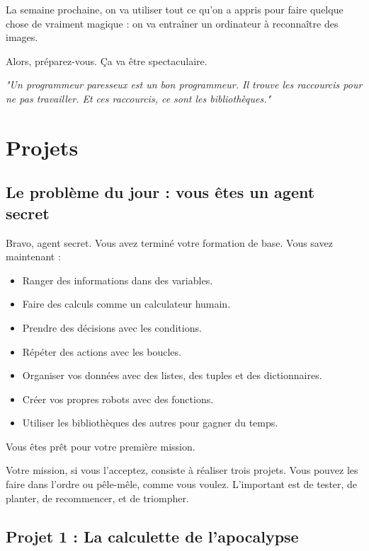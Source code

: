 \documentclass[12pt,a4paper]{article}
\begin{document}
La semaine prochaine, on va utiliser tout ce qu'on a appris pour faire quelque chose de vraiment magique : on va entraîner un ordinateur à reconnaître des images.

Alors, préparez-vous. Ça va être spectaculaire.

\newpage

\textit{\small "Un programmeur paresseux est un bon programmeur. Il trouve les raccourcis pour ne pas travailler. Et ces raccourcis, ce sont les bibliothèques."}


\section{Projets}

\subsection{Le problème du jour : vous êtes un agent secret}

Bravo, agent secret. Vous avez terminé votre formation de base. Vous savez maintenant :

\begin{itemize}
	\item [\ding{172}] Ranger des informations dans des variables.
	\item [\ding{173}] Faire des calculs comme un calculateur humain.
	\item [\ding{174}] Prendre des décisions avec les conditions.
	\item [\ding{175}] Répéter des actions avec les boucles.
	\item [\ding{176}] Organiser vos données avec des listes, des tuples et des dictionnaires.
	\item [\ding{177}] Créer vos propres robots avec des fonctions.
	\item [\ding{178}] Utiliser les bibliothèques des autres pour gagner du temps.
\end{itemize}

Vous êtes prêt pour votre première mission.

Votre mission, si vous l'acceptez, consiste à réaliser trois projets. Vous pouvez les faire dans l'ordre ou pêle-mêle, comme vous voulez. L'important est de tester, de planter, de recommencer, et de triompher.

\subsection*{Projet 1 : La calculette de l'apocalypse}
\end{document}
